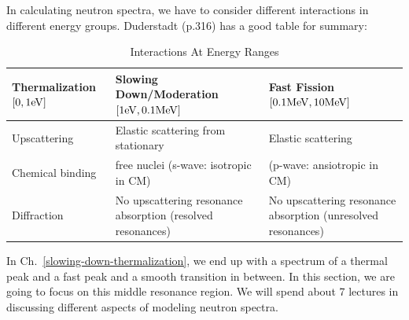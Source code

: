 \documentclass{school-22.211-notes}
\date{February 15, 2012}
\begin{document}
\maketitle



 \label{resonance-model-chap}

In calculating neutron spectra, we have to consider different interactions in different energy groups. Duderstadt (p.316) has a good table for summary: 
\begin{table}[ht]
  \centering
  \begin{tabular}{|p{1.3in}|p{2.3in}|p{2in}|} \hline
    Thermalization $[0,1\mathrm{eV}]$  & Slowing Down/Moderation $[1\mathrm{eV}, 0.1\mathrm{MeV}]$ & Fast Fission $[0.1\mathrm{MeV}, 10\mathrm{MeV}]$ \\ \hline
    Upscattering   & Elastic scattering from stationary  &  Elastic scattering  \\
    Chemical binding &free nuclei (s-wave: isotropic in CM) & (p-wave: ansiotropic in CM)\\
    Diffraction & No upscattering resonance absorption (resolved resonances) & No upscattering resonance absorption (unresolved resonances) \\ \hline
  \end{tabular}
  \caption{Interactions At Energy Ranges}
\end{table}



In Ch.~\ref{slowing-down-thermalization}, we end up with a spectrum of a thermal peak and a fast peak and a smooth transition in between. In this section, we are going to focus on this middle resonance region. We will spend about 7 lectures in discussing different aspects of modeling neutron spectra. 
\end{document}

